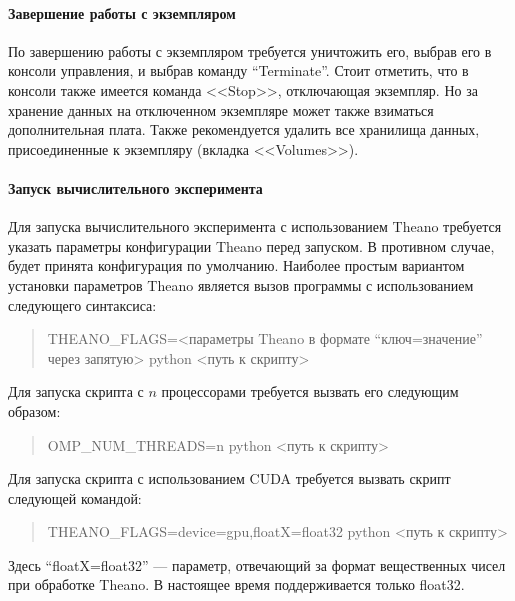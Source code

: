 \documentclass[12pt,twoside]{article}
\begin{document}
\paragraph{Завершение работы с экземпляром}
По завершению работы с экземпляром требуется уничтожить его, выбрав его в консоли управления, и выбрав команду ``Terminate''. Стоит отметить, что в консоли также имеется команда <<Stop>>, отключающая экземпляр. Но за хранение данных на отключенном экземпляре может также взиматься дополнительная плата. Также рекомендуется удалить все хранилища данных, присоединенные к экземпляру (вкладка <<Volumes>>).

\paragraph{Запуск вычислительного эксперимента}
Для запуска вычислительного эксперимента с использованием Theano требуется указать параметры конфигурации Theano перед запуском. В противном случае, будет принята конфигурация по умолчанию. Наиболее простым вариантом установки параметров Theano является вызов программы с использованием следующего синтаксиса:
\begin{quote}
THEANO\_FLAGS=<параметры Theano в формате ``ключ=значение'' через запятую> python <путь к скрипту>
\end{quote}

Для запуска скрипта с $n$ процессорами требуется вызвать его следующим образом:
\begin{quote}
OMP\_NUM\_THREADS=n python <путь к скрипту>
\end{quote}

Для запуска скрипта с использованием CUDA требуется вызвать скрипт следующей командой:
\begin{quote}
THEANO\_FLAGS=device=gpu,floatX=float32 python <путь к скрипту>
\end{quote}
Здесь ``floatX=float32'' --- параметр, отвечающий за формат вещественных чисел при обработке Theano. В настоящее время поддерживается только float32.
\end{document}
